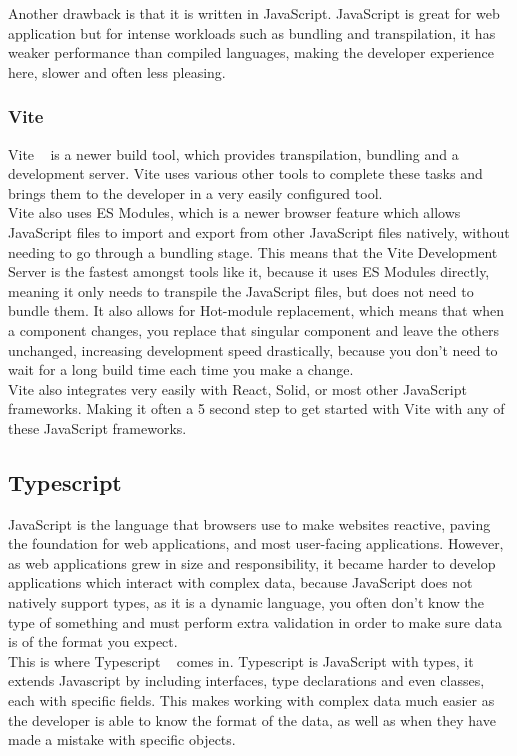 \documentclass[titlepage]{article}
\begin{document}
Another drawback is that it is written in JavaScript. JavaScript is great for web application but for intense workloads such as bundling and transpilation, it has weaker performance than compiled languages, making the developer experience here, slower and often less pleasing.

\subsubsection{Vite}
Vite ~\cite{vite} is a newer build tool, which provides transpilation, bundling and a development server. Vite uses various other tools to complete these tasks and brings them to the developer in a very easily configured tool. \\

Vite also uses ES Modules, which is a newer browser feature which allows JavaScript files to import and export from other JavaScript files natively, without needing to go through a bundling stage. This means that the Vite Development Server is the fastest amongst tools like it, because it uses ES Modules directly, meaning it only needs to transpile the JavaScript files, but does not need to bundle them. It also allows for Hot-module replacement, which means that when a component changes, you replace that singular component and leave the others unchanged, increasing development speed drastically, because you don't need to wait for a long build time each time you make a change. \\

Vite also integrates very easily with React, Solid, or most other JavaScript frameworks. Making it often a 5 second step to get started with Vite with any of these JavaScript frameworks.

\subsection{Typescript}
JavaScript is the language that browsers use to make websites reactive, paving the foundation for web applications, and most user-facing applications. However, as web applications grew in size and responsibility, it became harder to develop applications which interact with complex data, because JavaScript does not natively support types, as it is a dynamic language, you often don't know the type of something and must perform extra validation in order to make sure data is of the format you expect. \\

This is where Typescript ~\cite{typescript} comes in. Typescript is JavaScript with types, it extends Javascript by including interfaces, type declarations and even classes, each with specific fields. This makes working with complex data much easier as the developer is able to know the format of the data, as well as when they have made a mistake with specific objects. \\
\end{document}

